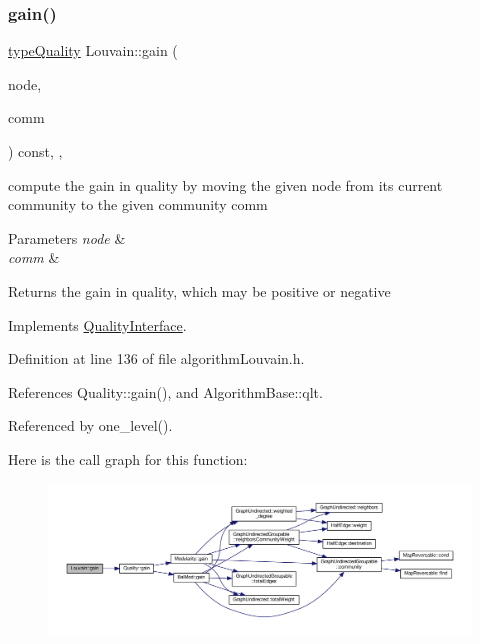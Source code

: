 \subsubsection{\texorpdfstring{gain()}{gain()}}
{\footnotesize\ttfamily \hyperlink{qualityInterface_8h_a15a3ec6041e6e02d00d2eff22c20fd94}{type\+Quality} Louvain\+::gain (\begin{DoxyParamCaption}\item[{const \hyperlink{edge_8h_a5fbd20c46956d479cb10afc9855223f6}{type\+Vertex} \&}]{node,  }\item[{const \hyperlink{graphUndirectedGroupable_8h_a914da95c9ea7f14f4b7f875c36818556}{type\+Community} \&}]{comm }\end{DoxyParamCaption}) const\hspace{0.3cm}{\ttfamily [inline]}, {\ttfamily [private]}, {\ttfamily [virtual]}}

compute the gain in quality by moving the given node from its current community to the given community comm 
\begin{DoxyParams}{Parameters}
{\em node} & \\
\hline
{\em comm} & \\
\hline
\end{DoxyParams}
\begin{DoxyReturn}{Returns}
the gain in quality, which may be positive or negative 
\end{DoxyReturn}


Implements \hyperlink{classQualityInterface_ab6a2e15d118c3945243abb96c7cc0360}{Quality\+Interface}.



Definition at line 136 of file algorithm\+Louvain.\+h.



References Quality\+::gain(), and Algorithm\+Base\+::qlt.



Referenced by one\+\_\+level().

Here is the call graph for this function\+:
\nopagebreak
\begin{figure}[H]
\begin{center}
\leavevmode
\includegraphics[width=350pt]{classLouvain_ac95d6e53e46b6321aa02b80f0c69bd13_cgraph}
\end{center}
\end{figure}
\mbox{\label{classLouvain_a6925703de3b3ead5b37af4b8a2ceb9b4}} 
